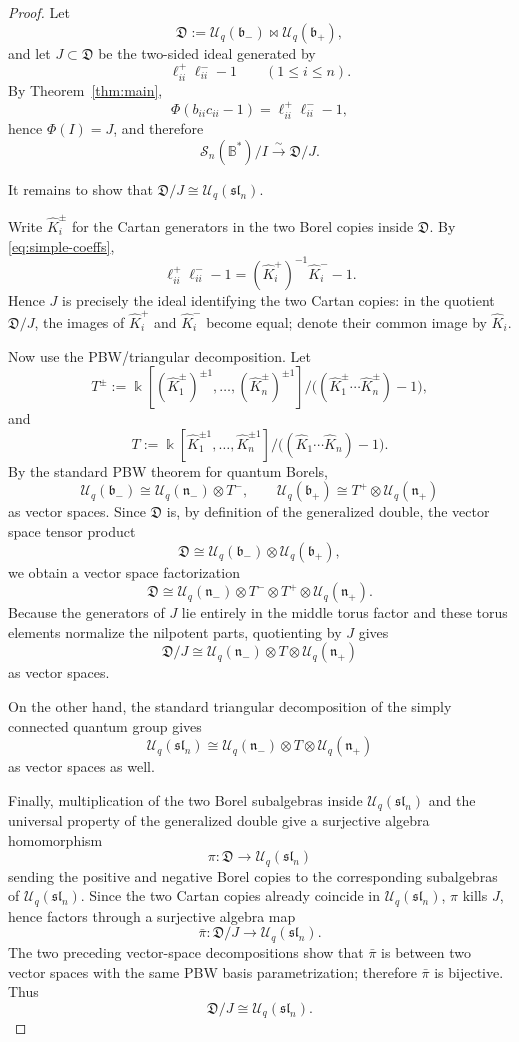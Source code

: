 \documentclass[11pt]{article}
\newcommand{\kk}{\Bbbk}
\newcommand{\Uc}{\mathcal U}
\newcommand{\bcS}{\mathcal S}
\newcommand{\fb}{\mathfrak b}
\newcommand{\fn}{\mathfrak n}
\newcommand{\fB}{\mathbb B}
\newcommand{\bipr}{\mathbin{\bowtie}}
\begin{document}
\begin{proof}
Let
\[
\mathfrak D:=\Uc_q(\fb_-)\bipr \Uc_q(\fb_+),
\]
and let \(J\subset \mathfrak D\) be the two-sided ideal generated by
\[
\ell^+_{ii}\ell^-_{ii}-1\qquad (1\le i\le n).
\]
By Theorem~\ref{thm:main},
\[
\Phi(b_{ii}c_{ii}-1)=\ell^+_{ii}\ell^-_{ii}-1,
\]
hence \(\Phi(I)=J\), and therefore
\[
\bcS_n(\fB^\ast)/I \xrightarrow{\sim} \mathfrak D/J.
\]

It remains to show that \(\mathfrak D/J\cong \Uc_q(\mathfrak{sl}_n)\).

\smallskip

Write \(\hat K_i^\pm\) for the Cartan generators in the two Borel copies inside \(\mathfrak D\). By \eqref{eq:simple-coeffs},
\[
\ell^+_{ii}\ell^-_{ii}-1
=
(\hat K_i^+)^{-1}\hat K_i^- -1.
\]
Hence \(J\) is precisely the ideal identifying the two Cartan copies:
in the quotient \(\mathfrak D/J\), the images of \(\hat K_i^+\) and \(\hat K_i^-\) become equal; denote their common image by \(\hat K_i\).

Now use the PBW/triangular decomposition.  Let
\[
T^\pm:=\kk[(\hat K_1^\pm)^{\pm1},\dots,(\hat K_n^\pm)^{\pm1}]
\big/\big((\hat K_1^\pm\cdots \hat K_n^\pm)-1\big),
\]
and
\[
T:=\kk[\hat K_1^{\pm1},\dots,\hat K_n^{\pm1}]
\big/\big((\hat K_1\cdots \hat K_n)-1\big).
\]
By the standard PBW theorem for quantum Borels,
\[
\Uc_q(\fb_-)\cong \Uc_q(\fn_-)\otimes T^-,
\qquad
\Uc_q(\fb_+)\cong T^+\otimes \Uc_q(\fn_+)
\]
as vector spaces. Since \(\mathfrak D\) is, by definition of the generalized double, the vector space tensor product
\[
\mathfrak D \cong \Uc_q(\fb_-)\otimes \Uc_q(\fb_+),
\]
we obtain a vector space factorization
\[
\mathfrak D \cong \Uc_q(\fn_-)\otimes T^-\otimes T^+\otimes \Uc_q(\fn_+).
\]
Because the generators of \(J\) lie entirely in the middle torus factor and these torus elements normalize the nilpotent parts, quotienting by \(J\) gives
\[
\mathfrak D/J \cong \Uc_q(\fn_-)\otimes T\otimes \Uc_q(\fn_+)
\]
as vector spaces.

On the other hand, the standard triangular decomposition of the simply connected quantum group gives
\[
\Uc_q(\mathfrak{sl}_n)\cong \Uc_q(\fn_-)\otimes T\otimes \Uc_q(\fn_+)
\]
as vector spaces as well.

Finally, multiplication of the two Borel subalgebras inside \(\Uc_q(\mathfrak{sl}_n)\) and the universal property of the generalized double give a surjective algebra homomorphism
\[
\pi:\mathfrak D\longrightarrow \Uc_q(\mathfrak{sl}_n)
\]
sending the positive and negative Borel copies to the corresponding subalgebras of \(\Uc_q(\mathfrak{sl}_n)\). Since the two Cartan copies already coincide in \(\Uc_q(\mathfrak{sl}_n)\), \(\pi\) kills \(J\), hence factors through a surjective algebra map
\[
\bar\pi:\mathfrak D/J\longrightarrow \Uc_q(\mathfrak{sl}_n).
\]
The two preceding vector-space decompositions show that \(\bar\pi\) is between two vector spaces with the same PBW basis parametrization; therefore \(\bar\pi\) is bijective. Thus
\[
\mathfrak D/J\cong \Uc_q(\mathfrak{sl}_n).
\]


\end{proof}
\end{document}
